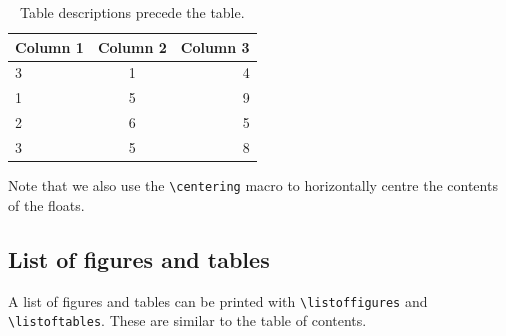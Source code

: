 \documentclass[11pt, twoside]{article}
\begin{document}
\begin{table}[H]
    \centering
    \caption{Table descriptions precede the table.}\label{tab:table}
    \begin{tabular}{l c r}
        \toprule
        \textbf{Column 1} & \textbf{Column 2} & \textbf{Column 3} \\
        \midrule
        3                 & 1                 & 4                 \\
        1                 & 5                 & 9                 \\
        2                 & 6                 & 5                 \\
        3                 & 5                 & 8                 \\
        \bottomrule
    \end{tabular}
\end{table}
Note that we also use the \lstinline{\centering} macro to horizontally centre the contents of the floats.
\subsection{List of figures and tables}
A list of figures and tables can be printed with \lstinline{\listoffigures} and  \lstinline{\listoftables}.
These are similar to the table of contents.
\end{document}
